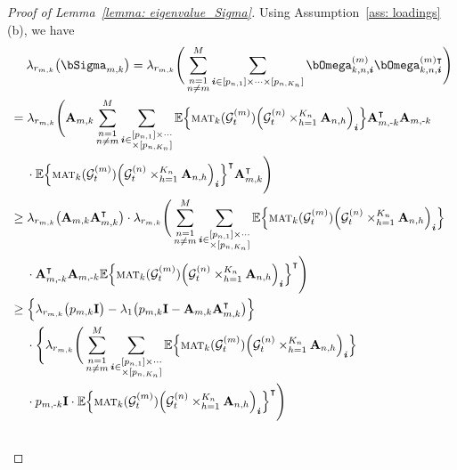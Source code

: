\documentclass[aos]{imsart}
\theoremstyle{plain}
\theoremstyle{definition}
\def\mat{\textnormal{\textsc{mat}}}
\def\E{\mathbb{E}}
\def\cG{\mathcal{G}} \def\cH{\boldsymbol{\mathcal{H}}} \def\cI{\mathcal{I}}
\def\bi{\boldsymbol{i}}
\def\bI{\mathbf{I}}
\def\bA{\mathbf{A}}
\def\trans{\intercal}
\begin{document}
\begin{proof}[Proof of Lemma~\ref{lemma: eigenvalue_Sigma}]
Using Assumption~\ref{ass: loadings}(b), we have
\begin{align}
    &\;\quad
    \lambda_{r_{m,k}}\big( \bSigma_{m,k} \big) = \lambda_{r_{m,k}}\Bigg( \sum_{\substack{n=1\\ n\neq m}}^M \sum_{\bi \in [p_{n,1}] \times \cdots \times[p_{n,K_n}]} \bOmega_{k,n,\bi}^{(m)} \bOmega_{k,n,\bi}^{(m) \trans} \Bigg) \notag \\
    &=
    \lambda_{r_{m,k}}\Bigg( \bA_{m,k} \sum_{\substack{n=1\\ n\neq m}}^M \sum_{\bi \in \substack{[p_{n,1}] \times \cdots\\ \times[p_{n,K_n}] }}
    \E\Big\{ \mat_k(\cG_t^{(m)}) \Big( \cG_t^{(n)} \times_{h=1}^{K_n} \bA_{n,h} \Big)_{\bi} \Big\} \bA_{m,\text{-}k}^\trans \bA_{m,\text{-}k} \notag \\
    &\;\quad
    \cdot \E\Big\{ \mat_k(\cG_t^{(m)}) \Big( \cG_t^{(n)} \times_{h=1}^{K_n} \bA_{n,h} \Big)_{\bi} \Big\}^\trans
    \bA_{m,k}^\trans \Bigg) \notag \\
    &\geq
    \lambda_{r_{m,k}}\big( \bA_{m,k} \bA_{m,k}^\trans \big) \cdot \lambda_{r_{m,k}}\Bigg( \sum_{\substack{n=1\\ n\neq m}}^M \sum_{\bi \in \substack{[p_{n,1}] \times \cdots\\ \times[p_{n,K_n}] }} \E\Big\{ \mat_k(\cG_t^{(m)}) \Big( \cG_t^{(n)} \times_{h=1}^{K_n} \bA_{n,h} \Big)_{\bi} \Big\} \notag \\
    &\;\quad
    \cdot \bA_{m,\text{-}k}^\trans \bA_{m,\text{-}k} \E\Big\{ \mat_k(\cG_t^{(m)}) \Big( \cG_t^{(n)} \times_{h=1}^{K_n} \bA_{n,h} \Big)_{\bi} \Big\}^\trans
    \Bigg) \notag \\
    &\geq
    \Big\{ \lambda_{r_{m,k}}\big( p_{m,k} \bI \big) - \lambda_1\big( p_{m,k} \bI - \bA_{m,k} \bA_{m,k}^\trans \big) \Big\} \notag \\
    &\;\quad
    \cdot \Bigg\{ \lambda_{r_{m,k}}\Bigg( \sum_{\substack{n=1\\ n\neq m}}^M \sum_{\bi \in \substack{[p_{n,1}] \times \cdots\\ \times[p_{n,K_n}] }} \E\Big\{ \mat_k(\cG_t^{(m)}) \Big( \cG_t^{(n)} \times_{h=1}^{K_n} \bA_{n,h} \Big)_{\bi} \Big\} \notag \\
    &\;\quad
    \cdot p_{m,\text{-}k} \bI \cdot \E\Big\{ \mat_k(\cG_t^{(m)}) \Big( \cG_t^{(n)} \times_{h=1}^{K_n} \bA_{n,h} \Big)_{\bi} \Big\}^\trans \Bigg) \notag \\
    &\;\quad

\end{align}
\end{proof}
\end{document}
